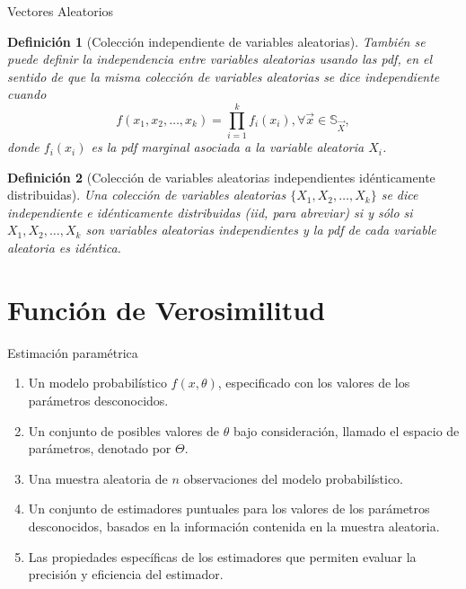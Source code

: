 \documentclass{beamer}
\newtheorem{defi}{Definición}[section]
\begin{document}
\begin{frame}[allowframebreaks]{Vectores Aleatorios}
	\begin{defi}[Colección independiente de variables aleatorias]
	También se puede definir la independencia entre variables aleatorias usando las pdf, en el sentido de que la misma colección de variables aleatorias se dice independiente cuando
	$$f(x_1,x_2,\dots,x_k)=\prod_{i=1}^k f_i(x_i), \forall\vec{x}\in\mathbb{S}_{\vec{X}},$$
	donde $f_i(x_i)$ es la pdf marginal asociada a la variable aleatoria $X_i$.
	
	\end{defi}
	
		\begin{defi}[Colección de variables aleatorias independientes idénticamente distribuidas]
		Una colección de variables aleatorias $\{ X_1,X_2,\dots, X_k\}$ se dice independiente e idénticamente distribuidas (iid, para abreviar) si y sólo si $X_1,X_2,\dots,X_k$ son variables aleatorias independientes y la pdf de cada variable aleatoria es idéntica.
	\end{defi}
	
	\end{frame}
	\section{Función de Verosimilitud}
	\begin{frame}{Estimación paramétrica}
	\begin{enumerate}
			\item Un modelo probabilístico $f(x,\theta)$, especificado con los valores de los parámetros desconocidos.
			\item Un conjunto de posibles valores de $\theta$ bajo consideración, llamado el espacio de parámetros, denotado por $\Theta$.
			\item Una muestra aleatoria de $n$ observaciones del modelo probabilístico.
			\item Un conjunto de estimadores puntuales para los valores de los parámetros desconocidos, basados en la información contenida en la muestra aleatoria.
			\item Las propiedades específicas de los estimadores que permiten evaluar la precisión y eficiencia del estimador.
		\end{enumerate}
	\end{frame}
	
\end{document}
